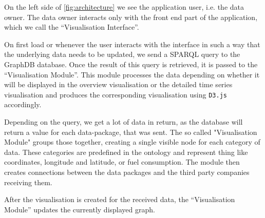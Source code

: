 \documentclass[../paper.tex]{subfiles}
\begin{document}
  On the left side of \cref{fig:architecture} we see the application user, i.e.
  the data owner. The data owner interacts only with the front end part of the
  application, which we call the “Visualisation Interface”.

  On first load or whenever the user interacts with the interface in such a way
  that the underlying data needs to be updated, we send a SPARQL query to the
  GraphDB database. Once the result of this query is retrieved, it is passed to
  the “Visualisation Module”. This module processes the data depending on
  whether it will be displayed in the overview visualisation or the detailed
  time series visualisation and produces the corresponding visualisation
  using \texttt{D3.js} accordingly.

  Depending on the query, we get a lot of data in return, as the database
  will return a value for each data-package, that was sent. The so called
  "Visualisation Module" groups those together, creating a single visible
  node for each category of data. These categories are predefined in the
  ontology and represent thing like coordinates, longitude and latitude, or
  fuel consumption. The module then creates connections between the data packages
  and the third party companies receiving them.

  After the visualisation is created for the received data, the “Visualisation Module”
  updates the currently displayed graph.

\end{document}
